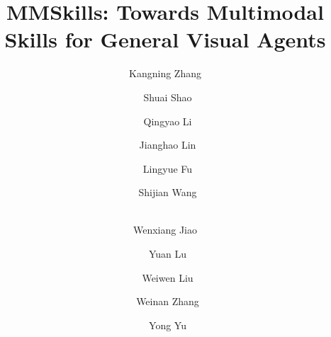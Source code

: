 \documentclass[]{selfevolagent}
\title{MMSkills: Towards Multimodal Skills for General Visual Agents}
\author[1,2\ddagger*]{Kangning Zhang}
\author[1,2\ddagger*]{~Shuai Shao}
\author[1,2*]{~Qingyao Li}
\author[1]{~Jianghao Lin}
\author[1]{~Lingyue Fu}
\author[3]{~Shijian Wang}
\author[2,\corrauth]{\\Wenxiang Jiao}
\author[2,\corrauth]{~Yuan Lu}
\author[1,\corrauth]{~Weiwen Liu}
\author[1,\corrauth]{~Weinan Zhang}
\author[1,\corrauth]{~Yong Yu}
\affiliation[1]{Shanghai Jiao Tong University}
\affiliation[2]{Xiaohongshu Inc.}
\affiliation[3]{Southeast University}
\theoremstyle{plain}
\theoremstyle{definition}
\theoremstyle{remark}
\begin{document}
\maketitle










\newpage
\beginappendix

\end{document}
